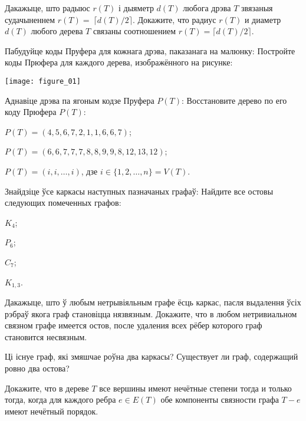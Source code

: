 \documentclass[12pt, a4paper]{article}
\begin{document}
\begin{problemList}
\medskip

\problemItemSimple
{Дакажыце, што радыюс $r(T)$ і дыяметр $d(T)$ любога дрэва $T$ звязаныя судачыненнем $r(T)=~\lceil d(T)/2 \rceil$.}
{Докажите, что радиус $r(T)$ и диаметр $d(T)$ любого дерева $T$ связаны соотношением $r(T)=\lceil d(T)/2 \rceil$.}

\bigskip

\problemItemWithCommonPart
{Пабудуйце коды Пруфера для кожнага дрэва, паказанага на малюнку:}
{Постройте коды Прюфера для каждого дерева, изображённого на рисунке:}
{%
\begin{center}
    \texttt{[image: figure\_01]}
\end{center}
}

\problemItemWithCommonPart
{Аднавіце дрэва па ягоным кодзе Пруфера $P(T)$:}
{Восстановите дерево по его коду Прюфера $P(T)$:}
{%
\begin{belarusianEnumerate}
    \item $P(T)=(4, 5, 6, 7, 2, 1, 1, 6, 6, 7)$;
    \item $P(T)=(6, 6, 7, 7, 7, 8, 8, 9, 9, 8, 12, 13, 12)$;
    \item $P(T)=(i, i, \ldots, i)$, дзе $i\in\{1, 2, \ldots, n\}=V(T)$.
\end{belarusianEnumerate}
}

\smallskip

\problemItemWithCommonPart
{Знайдзіце ўсе каркасы наступных пазначаных графаў:}
{Найдите все остовы следующих помеченных графов:}
{%
\begin{belarusianEnumerateTwocol}
    \item $K_4$;
    \item $P_6$;
    \item $C_7$;
    \item $K_{1, 3}$.
\end{belarusianEnumerateTwocol}
}

\smallskip

\problemItemSimple
{Дакажыце, што ў любым нетрывіяльным графе ёсць каркас,
пасля выдалення ўсіх рэбраў якога граф становіцца нязвязным.}
{Докажите, что в любом нетривиальном связном графе имеется остов,
после удаления всех рёбер которого граф становится несвязным.}

\bigskip

\problemItemSimple
{Ці існуе граф, які змяшчае роўна два каркасы?}
{Существует ли граф, содержащий ровно два остова?}

\bigskip

{Докажите, что в дереве $T$ все вершины имеют нечётные степени тогда и только тогда, когда для каждого ребра $e\in E(T)$ обе компоненты связности графа $T-e$ имеют нечётный порядок.}


\end{problemList}
\end{document}
